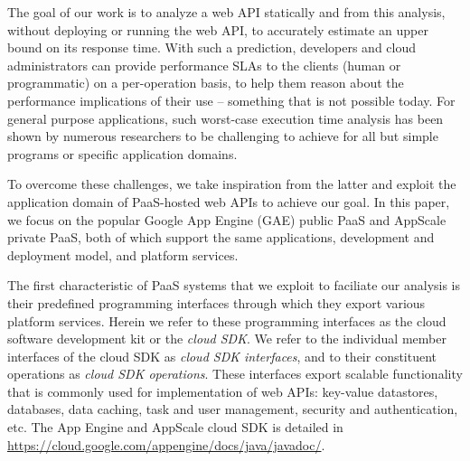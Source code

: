 The goal of our work is to analyze a web API statically and from this analysis, 
without deploying or running the web API, 
to accurately estimate an upper bound on its response time. With such a prediction,
developers and cloud administrators can provide performance SLAs to the clients (human or 
programmatic) on a per-operation basis, to help them reason about 
the performance implications of their use -- something that is not possible today.
For general purpose applications, such worst-case execution time analysis has been shown
by numerous researchers to be challenging to achieve for all but 
simple programs or specific application domains.

To overcome these challenges, we take inspiration from the latter and exploit 
the application domain of PaaS-hosted web APIs to achieve our goal.  
In this paper, we focus on the popular Google App Engine (GAE) public PaaS 
and AppScale private PaaS, both of which support the same applications, 
development and deployment model, and platform services.

The first characteristic of PaaS systems
that we exploit to faciliate our analysis 
is their predefined programming interfaces 
through which they export various platform services. 
Herein we refer to these programming interfaces as the cloud software development 
kit or the \textit{cloud SDK}. We refer to the individual member interfaces of the cloud SDK
as \textit{cloud SDK interfaces}, and to their constituent operations 
as \textit{cloud SDK operations}.  These interfaces export scalable
functionality that is commonly used for implementation of web APIs:  
key-value datastores, databases,
data caching, task and user management, security and authentication, etc.
The App Engine and AppScale cloud SDK is detailed 
in \url{https://cloud.google.com/appengine/docs/java/javadoc/}. 


